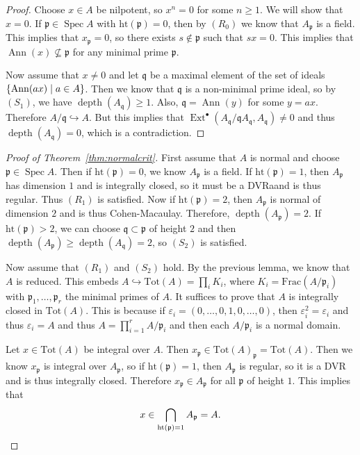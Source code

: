 \documentclass[leqno, openany]{memoir}
\theoremstyle{definition}
\theoremstyle{remark}
\theoremstyle{plain}
\theoremstyle{definition}
\theoremstyle{remark}
\newcommand{\ep}{\varepsilon}
\newcommand{\mf}[1]{\mathfrak{#1}}
\newcommand{\mr}[1]{\mathrm{#1}}
\DeclareMathOperator{\Spec}{Spec}
\DeclareMathOperator{\Ext}{Ext}
\DeclareMathOperator{\Ann}{Ann}
\DeclareMathOperator{\dpth}{depth}
\begin{document}
\begin{proof}
    Choose $x \in A$ be nilpotent, so $x^n = 0$ for some $n \geq 1$. We will show that $x = 0$. If $\mf{p} \in \Spec A$ with $\mr{ht}(\mf{p}) = 0$, then by $(R_0)$ we know that $A_{\mf{p}}$ is a field. This implies that $x_{\mf{p}} = 0$, so there exists $s \notin \mf{p}$ such that $sx = 0$. This implies that $\Ann(x) \not\subseteq \mf{p}$ for any minimal prime $\mf{p}$.

    Now assume that $x \neq 0$ and let $\mf{q}$ be a maximal element of the set of ideals $\qty{\Ann(ax) \mid a \in A}$. Then we know that $\mf{q}$ is a non-minimal prime ideal, so by $(S_1)$, we have $\dpth(A_{\mf{q}}) \geq 1$. Also, $\mf{q} = \Ann(y)$ for some $y = ax$. Therefore $A/\mf{q} \hookrightarrow A$. But this implies that $\Ext^{\bullet}(A_{\mf{q}} / \mf{q} A_{\mf{q}}, A_{\mf{q}}) \neq 0$ and thus $\dpth(A_{\mf{q}}) = 0$, which is a contradiction.
\end{proof}

\begin{proof}[Proof of Theorem~\ref{thm:normalcrit}]
    First assume that $A$ is normal and choose $\mf{p} \in \Spec A$. Then if $\mr{ht}(\mf{p}) = 0$, we know $A_{\mf{p}}$ is a field. If $\mr{ht}(\mf{p}) = 1$, then $A_{\mf{p}}$ has dimension $1$ and is integrally closed, so it must be a DVRaand is thus regular. Thus $(R_1)$ is satisfied. Now if $\mr{ht}(\mf{p}) = 2$, then $A_{\mf{p}}$ is normal of dimension $2$ and is thus Cohen-Macaulay. Therefore, $\dpth(A_{\mf{p}}) = 2$. If $\mr{ht}(\mf{p}) > 2$, we can choose $\mf{q} \subset \mf{p}$ of height $2$ and then $\dpth(A_{\mf{p}}) \geq \dpth(A_{\mf{q}}) = 2$, so $(S_2)$ is satisfied.

    Now assume that $(R_1)$ and $(S_2)$ hold. By the previous lemma, we know that $A$ is reduced. This embeds $A \hookrightarrow \mr{Tot}(A) = \prod_i K_i$, where $K_i = \mr{Frac}(A/\mf{p}_i)$ with $\mf{p}_1, \ldots, \mf{p}_r$ the minimal primes of $A$. It suffices to prove that $A$ is integrally closed in $\mr{Tot}(A)$. This is because if $\ep_i = (0, \ldots, 0, 1, 0, \ldots, 0)$, then $\ep_i^2 = \ep_i$ and thus $\ep_i = A$ and thus $A = \prod_{i=1}^r A/\mf{p}_i$ and then each $A/\mf{p}_i$ is a normal domain. 

    Let $x \in \mr{Tot}(A)$ be integral over $A$. Then $x_{\mf{p}} \in {\mr{Tot}(A)}_{\mf{p}} = \mr{Tot}(A)$. Then we know $x_{\mf{p}}$ is integral over $A_{\mf{p}}$, so if $\mr{ht}(\mf{p}) = 1$, then $A_{\mf{p}}$ is regular, so it is a DVR and is thus integrally closed. Therefore $x_{\mf{p}} \in A_{\mf{p}}$ for all $\mf{p}$ of height $1$. This implies that
    \[ x \in \bigcap_{\mr{ht}(\mf{p}) = 1} A_{\mf{p}} = A. \qedhere \]
\end{proof}
\end{document}

